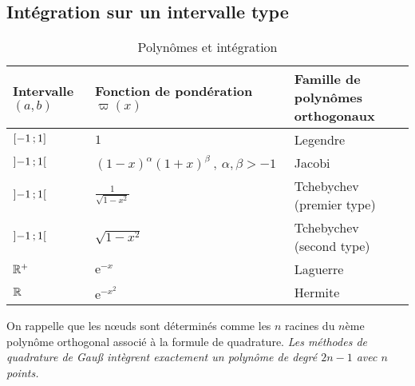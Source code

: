 \subsection*{Intégration sur un intervalle type} 
\begin{table}[ht]\centering\small
\begin{tabular}{lll} Intervalle $(a,b)$ & Fonction de pondération $\varpi(x)$ & Famille de polynômes orthogonaux\\ \hline $\mathopen{[}-1\,;1\mathclose{]}$ & $1$ & Legendre\\ $\mathopen{]}-1\,;1\mathclose{[}$ & $(1-x)^\alpha (1+x)^\beta \ , \ \alpha, \beta > -1$ & Jacobi\\ $\mathopen{]}-1\,;1\mathclose{[}$ & $\frac{1}{\sqrt{1-x^2}}$ &Tchebychev (premier type)\\ $\mathopen{]}-1\,;1\mathclose{[}$ & $\sqrt{1-x^2}$ & Tchebychev (second type)\\ $\mathbb R^+$ & $\mathrm{e}^{-x}$ & Laguerre\\ $\mathbb R$ & $\mathrm{e}^{-x^2}$ & Hermite\\ 
\end{tabular} 
\caption{Polynômes et intégration}
\end{table} 
On rappelle que les nœuds sont déterminés comme les $n$ racines du $n$ème polynôme orthogonal associé à la formule de quadrature. 
 \emph{Les méthodes de quadrature de Gauß intègrent exactement un polynôme de degré $2n-1$ avec $n$ points.} 
 

